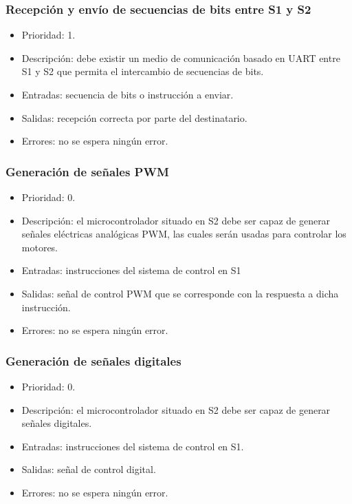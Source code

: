 \subsubsection{Recepción y envío de secuencias de bits entre \ac{S1} y \ac{S2}}
\begin{itemize}
    \item Prioridad: 1.
    \item Descripción: debe existir un medio de comunicación basado en \ac{UART} entre \ac{S1} y \ac{S2} que permita el intercambio de secuencias de bits.
    \item Entradas: secuencia de bits o instrucción a enviar.
    \item Salidas: recepción correcta por parte del destinatario.
    \item Errores: no se espera ningún error.
\end{itemize}

\subsubsection{Generación de señales \ac{PWM}}
\begin{itemize}
    \item Prioridad: 0.
    \item Descripción: el microcontrolador situado en \ac{S2} debe ser capaz de generar señales eléctricas analógicas \ac{PWM}, las cuales serán usadas para controlar los motores.
    \item Entradas: instrucciones del sistema de control en \ac{S1}
    \item Salidas: señal de control \ac{PWM} que se corresponde con la respuesta a dicha instrucción.
    \item Errores: no se espera ningún error.
\end{itemize}

\subsubsection{Generación de señales digitales}
\begin{itemize}
    \item Prioridad: 0.
    \item Descripción: el microcontrolador situado en \ac{S2} debe ser capaz de generar señales digitales.
    \item Entradas: instrucciones del sistema de control en \ac{S1}.
    \item Salidas: señal de control digital.
    \item Errores: no se espera ningún error.
\end{itemize}

